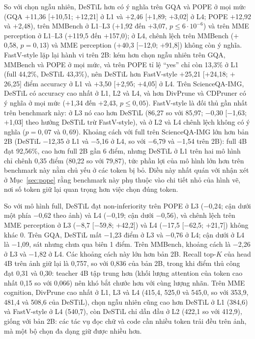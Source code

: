 \documentclass[conference]{IEEEtran}
\newcommand{\mi}{\ensuremath{-}}            %
\newcommand{\pl}{\ensuremath{+}}
\begin{document}
So với chọn ngẫu nhiên, DeSTiL hơn có ý nghĩa trên GQA và POPE ở mọi mức (GQA \pl11,36 [\pl10,51; \pl12,21] ở L1 và \pl2,46 [\pl1,89; \pl3,02] ở L4; POPE \pl12,92 và \pl2,48), trên MMBench ở L1--L3 (\pl1,92 đến \pl3,07, $p\le6\cdot10^{-6}$) và trên MME perception ở L1--L3 (\pl119,5 đến \pl157,0); ở L4, chênh lệch trên MMBench (\pl0,58, $p=0{,}13$) và MME perception (\pl40,3 [\mi12,0; \pl91,8]) không còn ý nghĩa. FastV-style lặp lại hành vi trên 2B: kém hơn chọn ngẫu nhiên trên GQA, MMBench và POPE ở mọi mức, và trên POPE tỉ lệ ``yes'' chỉ còn 13,3\% ở L1 (full 44,2\%, DeSTiL 43,3\%), nên DeSTiL hơn FastV-style \pl25,21 [\pl24,18; \pl26,25] điểm accuracy ở L1 và \pl3,50 [\pl2,95; \pl4,05] ở L4. Trên ScienceQA-IMG, DeSTiL có accuracy cao nhất ở L1, L2 và L4, và hơn DivPrune và CDPruner có ý nghĩa ở mọi mức (\pl1,34 đến \pl2,43, $p\le0{,}05$). FastV-style là đối thủ gần nhất trên benchmark này: ở L3 nó cao hơn DeSTiL (86,27 so với 85,97; \mi0,30 [\mi1,63; \pl1,03] theo hướng DeSTiL trừ FastV-style), và ở L2 và L4 chênh lệch không có ý nghĩa ($p=0{,}07$ và $0{,}69$). Khoảng cách với full trên ScienceQA-IMG lớn hơn bản 2B (DeSTiL \mi12,35 ở L1 và \mi5,16 ở L4, so với \mi6,79 và \mi1,54 trên 2B): full 4B đạt 92,56\%, cao hơn full 2B gần 6 điểm, nhưng DeSTiL ở L1 trên hai mô hình chỉ chênh 0,35 điểm (80,22 so với 79,87), tức phần lợi của mô hình lớn hơn trên benchmark này nằm chủ yếu ở các token bị bỏ. Điều này nhất quán với nhận xét ở Mục~\ref{sec:pope} rằng benchmark này phụ thuộc vào chi tiết nhỏ của hình vẽ, nơi số token giữ lại quan trọng hơn việc chọn đúng token.

So với mô hình full, DeSTiL đạt non-inferiority trên POPE ở L3 (\mi0,24; cận dưới một phía \mi0,62 theo ảnh) và L4 (\mi0,19; cận dưới \mi0,56), và chênh lệch trên MME perception ở L3 (\mi8,7 [\mi59,8; \pl42,2]) và L4 (\mi17,5 [\mi62,5; \pl21,7]) không khác 0. Trên GQA, DeSTiL mất \mi1,23 điểm ở L3 và \mi0,76 ở L4; cận dưới ở L4 là \mi1,09, sát nhưng chưa qua biên 1 điểm. Trên MMBench, khoảng cách là \mi2,26 ở L3 và \mi1,82 ở L4. Các khoảng cách này lớn hơn bản 2B. Recall top-$K$ của head 4B trên ảnh giữ lại là 0,757, so với 0,836 của bản 2B, trong khi điểm thủ công đạt 0,31 và 0,30: teacher 4B tập trung hơn (khối lượng attention của token cao nhất 0,15 so với 0,066) nên khó bắt chước hơn với cùng lượng nhãn. Trên MME cognition, DivPrune cao nhất ở L1, L3 và L4 (415,4, 525,0 và 545,0, so với 353,9, 481,4 và 508,6 của DeSTiL), chọn ngẫu nhiên cũng cao hơn DeSTiL ở L1 (384,6) và FastV-style ở L4 (540,7), còn DeSTiL chỉ dẫn đầu ở L2 (422,1 so với 412,9), giống với bản 2B: các tác vụ đọc chữ và code cần nhiều token trải đều trên ảnh, mà một bộ chọn đa dạng giữ được nhiều hơn.
\end{document}
